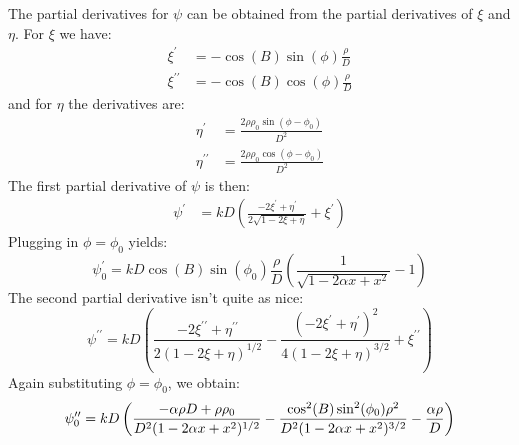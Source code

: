 \documentclass{article}
\theoremstyle{plain}
\begin{document}
        \par\hfill\par
        The partial derivatives for $\psi$ can be obtained from the partial
        derivatives of $\xi$ and $\eta$. For $\xi$ we have:
        \begin{align}
            \xi^{\prime}
            &=-\cos(B)\sin(\phi)\frac{\rho}{D}\\
            \xi^{\prime\prime}
            &=-\cos(B)\cos(\phi)\frac{\rho}{D}
        \end{align}
        and for $\eta$ the derivatives are:
        \begin{align}
            \eta^{\prime}
            &=\frac{2\rho\rho_{0}\sin(\phi-\phi_{0})}{D^{2}}\\
            \eta^{\prime\prime}
            &=\frac{2\rho\rho_{0}\cos(\phi-\phi_{0})}{D^{2}}
        \end{align}
        The first partial derivative of $\psi$ is then:
        \begin{align}
            \psi^{\prime}
            &=kD\left(
                \frac{-2\xi^{\prime}+\eta^{\prime}}{2\sqrt{1-2\xi+\eta}}
                +\xi^{\prime}
            \right)
        \end{align}
        Plugging in $\phi=\phi_{0}$ yields:
        \begin{equation}
            \psi^{\prime}_{0}
            =kD\cos(B)\sin(\phi_{0})\frac{\rho}{D}\left(
                \frac{1}{\sqrt{1-2\alpha{x}+x^{2}}}-1
            \right)
        \end{equation}
        The second partial derivative isn't quite as nice:
        \begin{equation}
            \psi^{\prime\prime}
            =kD\left(
                    \frac{-2\xi^{\prime\prime}+\eta^{\prime\prime}}
                          {2(1-2\xi+\eta)^{1/2}}-
                    \frac{(-2\xi^{\prime}+\eta^{\prime})^{2}}
                         {4(1-2\xi+\eta)^{3/2}}+
                    \xi^{\prime\prime}
            \right)
        \end{equation}
        Again substituting $\phi=\phi_{0}$, we obtain:
        \begin{equation}
            \psi^{\prime\prime}_{0}
            =kD\left(
                \frac{%
                    -\alpha\rho{D}+\rho\rho_{0}
                }{%
                    D^{2}(1-2\alpha{x}+x^{2})^{1/2}
                }
                -\frac{%
                    \cos^{2}(B)\sin^{2}(\phi_{0})\rho^{2}
                }{%
                    D^{2}(1-2\alpha{x}+x^{2})^{3/2}
                }
                -\frac{\alpha\rho}{D}
            \right)
        \end{equation}
\end{document}
